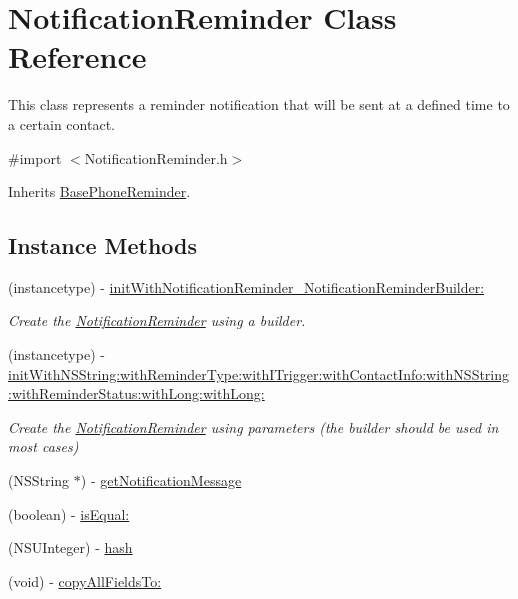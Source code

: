\hypertarget{interface_notification_reminder}{}\section{Notification\+Reminder Class Reference}
\label{interface_notification_reminder}


This class represents a reminder notification that will be sent at a defined time to a certain contact.  




{\ttfamily \#import $<$Notification\+Reminder.\+h$>$}



Inherits \hyperlink{interface_base_phone_reminder}{Base\+Phone\+Reminder}.

\subsection*{Instance Methods}
\begin{DoxyCompactItemize}
\item 
(instancetype) -\/ \hyperlink{interface_notification_reminder_ae03933531dcff4ca2dcaaf54bab38fb5}{init\+With\+Notification\+Reminder\+\_\+\+Notification\+Reminder\+Builder\+:}
\begin{DoxyCompactList}\small\item\em Create the \hyperlink{interface_notification_reminder}{Notification\+Reminder} using a builder. \end{DoxyCompactList}\item 
(instancetype) -\/ \hyperlink{interface_notification_reminder_a83a4f494bd838aa11f872fdbf5ab91ff}{init\+With\+N\+S\+String\+:with\+Reminder\+Type\+:with\+I\+Trigger\+:with\+Contact\+Info\+:with\+N\+S\+String\+:with\+Reminder\+Status\+:with\+Long\+:with\+Long\+:}
\begin{DoxyCompactList}\small\item\em Create the \hyperlink{interface_notification_reminder}{Notification\+Reminder} using parameters (the builder should be used in most cases) \end{DoxyCompactList}\item 
(N\+S\+String $\ast$) -\/ \hyperlink{interface_notification_reminder_add41d54129ad3f9f3eeaf8b9c08c739a}{get\+Notification\+Message}
\item 
(boolean) -\/ \hyperlink{interface_notification_reminder_a3b064f06818449a51bc0a1a556513377}{is\+Equal\+:}
\item 
(N\+S\+U\+Integer) -\/ \hyperlink{interface_notification_reminder_a2df0a4b1031225ccbcfed39d043a481b}{hash}
\item 
(void) -\/ \hyperlink{interface_notification_reminder_afc195a3a09255d6a581cf0d94ee3bff3}{copy\+All\+Fields\+To\+:}
\end{DoxyCompactItemize}
